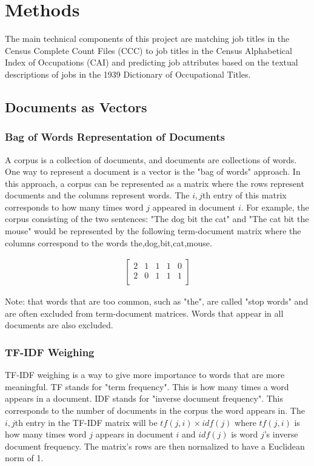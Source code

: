 \documentclass[12pt]{article}
\begin{document}
\section{Methods}
The main technical components of this project are matching job titles in the Census Complete Count Files (CCC)
to job titles in the Census Alphabetical Index of Occupations (CAI) and predicting job attributes
based on the textual descriptions of jobs in the 1939 Dictionary of Occupational Titles.

  \subsection{Documents as Vectors}
    \subsubsection{Bag of Words Representation of Documents}
      A corpus is a collection of documents, and documents are collections of words. One way to represent a document is a vector is the "bag of words" approach. In this approach, a corpus can be represented as a matrix where the rows represent documents and the columns represent words. The $i,j$th entry of this matrix corresponds to how many times word $j$ appeared in document $i$. For example, the corpus consisting of the two sentences: "The dog bit the cat" and "The cat bit the mouse" would be represented by the following term-document matrix where the columns correspond to the words the,dog,bit,cat,mouse.

        \begin{align*}
        \begin{bmatrix}
        2 & 1 & 1 & 1 & 0\\
        2 & 0 & 1 & 1 & 1\\
        \end{bmatrix}
        \end{align*}

        Note: that words that are too common, such as "the", are called "stop words" and are often excluded from term-document matrices. Words that appear in all documents are also excluded.

      \subsubsection{TF-IDF Weighing}
      TF-IDF weighing is a way to give more importance to words that are more meaningful. TF stands for "term frequency". This is how many times a word appears in a document. IDF stands for "inverse document frequency". This corresponds to the number of documents in the corpus the word appears in. The $i,j$th entry in the TF-IDF matrix will be $tf(j,i) \times idf(j)$ where $tf(j,i)$ is how many times word $j$ appears in document $i$ and $idf(j)$ is word $j$'s inverse document frequency. The matrix's rows are then normalized to have a Euclidean norm of 1.\\
\end{document}
